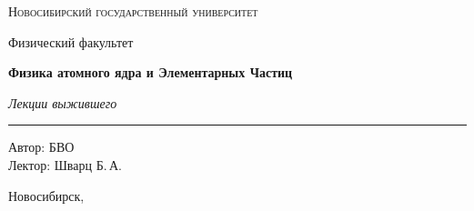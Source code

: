 \documentclass[12pt,a4paper]{report}
\begin{document}
\hypersetup{pageanchor=false}
\begin{titlepage}
    \thispagestyle{empty}

    \begin{center}
        \vspace*{1.5cm}

        {\Large\scshape Новосибирский государственный университет\par}
        \vspace{0.25cm}
        {\large Физический факультет\par}

        \vfill

        {\Huge\bfseries Физика атомного ядра и Элементарных Частиц\par}

        \vspace{0.45cm}

        {\Large\itshape Лекции выжившего\par}

        \vspace{0.8cm}

        \rule{0.72\linewidth}{0 pt}





        \vfill

        \begin{flushright}
            \large
            Автор: БВО\\[0.25cm]
            Лектор: Шварц Б.\,А.
        \end{flushright}

        \vspace{1.2cm}

        {\large Новосибирск, \the\year}

    \end{center}
\end{titlepage}
\hypersetup{pageanchor=true}

\tableofcontents
\newpage



\clearpage

\clearpage

\clearpage

\clearpage

\clearpage

\clearpage
\end{document}
